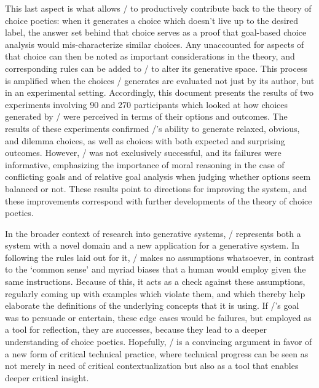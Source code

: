This last aspect is what allows \dunyazad/ to productively contribute back to the theory of choice poetics: when it generates a choice which doesn't live up to the desired label, the answer set behind that choice serves as a proof that goal-based choice analysis would mis-characterize similar choices.
%
Any unaccounted for aspects of that choice can then be noted as important considerations in the theory, and corresponding rules can be added to \dunyazad/ to alter its generative space.
%
This process is amplified when the choices \dunyazad/ generates are evaluated not just by its author, but in an experimental setting.
%
Accordingly, this document presents the results of two experiments involving 90 and 270 participants which looked at how choices generated by \dunyazad/ were perceived in terms of their options and outcomes.
%
The results of these experiments confirmed \dunyazad/'s ability to generate relaxed, obvious, and dilemma choices, as well as choices with both expected and surprising outcomes.
%
However, \dunyazad/ was not exclusively successful, and its failures were informative, emphasizing the importance of moral reasoning in the case of conflicting goals and of relative goal analysis when judging whether options seem balanced or not. 
%
These results point to directions for improving the system, and these improvements correspond with further developments of the theory of choice poetics.


In the broader context of research into generative systems, \dunyazad/ represents both a system with a novel domain and a new application for a generative system.
%
In following the rules laid out for it, \dunyazad/ makes no assumptions whatsoever, in contrast to the `common sense' and myriad biases that a human would employ given the same instructions.
%
Because of this, it acts as a check against these assumptions, regularly coming up with examples which violate them, and which thereby help elaborate the definitions of the underlying concepts that it is using.
%
If \dunyazad/'s goal was to persuade or entertain, these edge cases would be failures, but employed as a tool for reflection, they are successes, because they lead to a deeper understanding of choice poetics.
%
Hopefully, \dunyazad/ is a convincing argument in favor of a new form of critical technical practice, where technical progress can be seen as not merely in need of critical contextualization but also as a tool that enables deeper critical insight.
